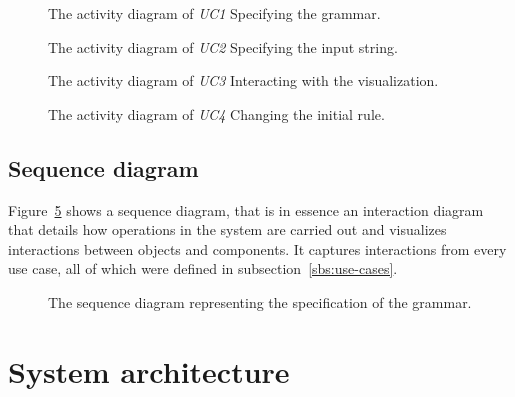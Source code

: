 \documentclass[english,engineering]{wizthesis}
\begin{document}
\begin{figure}[H]
  \centering
  \resizebox{!}{5cm}{\footnotesize}
  \caption{The activity diagram of \emph{UC1} Specifying the grammar.}
  \label{fig:uc1-activity-diagram}
\end{figure}

\begin{figure}[H]
  \centering
  \resizebox{!}{5cm}{\footnotesize}
  \caption{The activity diagram of \emph{UC2} Specifying the input string.}
  \label{fig:uc2-activity-diagram}
\end{figure}

\begin{figure}[H]
  \centering
  \resizebox{!}{5cm}{\footnotesize}
  \caption{The activity diagram of \emph{UC3} Interacting with the
  \label{fig:uc3-activity-diagram}
  visualization.}
\end{figure}

\begin{figure}[H]
  \centering
  \resizebox{!}{5cm}{\footnotesize}
  \caption{The activity diagram of \emph{UC4} Changing the initial rule.}
  \label{fig:uc4-activity-diagram}
\end{figure}

\subsection{Sequence diagram}

Figure~\ref{fig:sequence-diagram} shows a sequence diagram, that is in essence
an interaction diagram that details how operations in the system are carried out
and visualizes interactions between objects and components. It captures
interactions from every use case, all of which were defined in
subsection~\ref{sbs:use-cases}.

\begin{figure}[H]
  \centering
  \resizebox{0.65\textwidth}{!}{\footnotesize}
  \caption{The sequence diagram representing the specification of the grammar.}
  \label{fig:sequence-diagram}
\end{figure}

\newpage

\section{System architecture} \label{sec:system-architecture}
\end{document}
